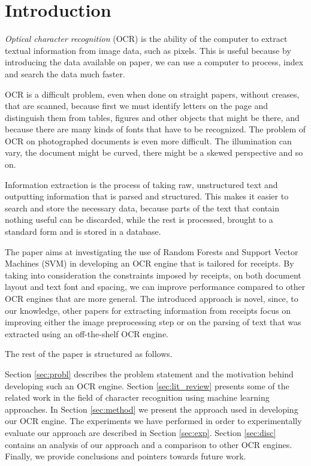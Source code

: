 \section{Introduction}
\textit{Optical character recognition} (OCR) is the ability of the computer to extract textual information from image data, such as pixels\cite{schantz1982history}. This is useful because by introducing the data available on paper, we can use a computer to process, index and search the data much faster.  

OCR is a difficult problem, even when done on straight papers, without creases, that are scanned, because first we must identify letters on the page and distinguish them from tables, figures and other objects that might be there, and because there are many kinds of fonts that have to be recognized. The problem of OCR on photographed documents is even more difficult. The illumination can vary, the document might be curved, there might be a skewed perspective and so on. 

Information extraction is the process of taking raw, unstructured text and outputting information that is parsed and structured. This makes it easier to search and store the necessary data, because parts of the text that contain nothing useful can be discarded, while the rest is processed, brought to a standard form and is stored in a database. 

The paper aims at investigating the use of Random Forests\cite{breiman2001random} and Support Vector Machines (SVM)\cite{Cortes_1995} in developing an OCR engine that is tailored for receipts. By taking into consideration the constraints imposed by receipts, on both document layout and text font and spacing, we can improve performance compared to other OCR engines that are more general. The introduced approach is novel, since, to our knowledge, other papers for extracting information from receipts focus on improving either the image preprocessing step or on the parsing of text that was extracted using an off-the-shelf OCR engine.

The rest of the paper is structured as follows.

Section \ref{sec:probl} describes the problem statement and the motivation behind developing such an OCR engine. Section \ref{sec:lit_review} presents some of the related work in the field of character recognition using machine learning approaches. In Section \ref{sec:method} we present the approach used in developing our OCR engine. The experiments we have performed in order to experimentally evaluate our approach are described in Section \ref{sec:exp}. Section \ref{sec:disc} contains an analysis of our approach and a comparison to other OCR engines. Finally, we provide conclusions and pointers towards future work. 

